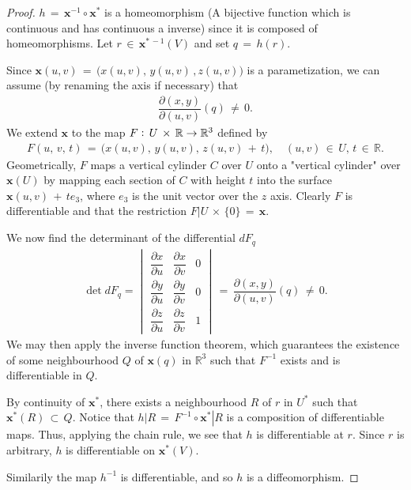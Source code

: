 \documentclass{UKZNcomp}
\newcommand{\vect}[1]{\mathbf{#1}} %
\theoremstyle{definition}
\theoremstyle{remark}
\begin{document}
\begin{proof}
$h\,=\,\vect x^{-1}\circ\vect x^*$ is a homeomorphism (A bijective function which is continuous and has continuous a inverse) since it is composed of homeomorphisms. Let $r\,\in\,\vect x^{*\,-1}(V)$ and set $q\,=\,h(r)$.

Since $\vect x(u,v)\,=\,\big(x(u,v),\,y(u,v)\,,z(u,v)\big)$ is a parametization, we can assume (by renaming the axis if necessary) that
\begin{align*}
\dfrac{\partial (x,y)}{\partial (u,v)}(q)\,\neq\,0.
\end{align*}
We extend $\vect x$ to the map $F\vcentcolon\,U\,\times\,\mathbb{R}\to\mathbb{R}^3$ defined by 
\begin{align*}
F(u,\,v,\,t)\,=\,\big(x(u,v),\,y(u,v),\,z(u,v)\,+\,t\big),\quad (u,v)\,\in\,U,\,t\,\in\,\mathbb{R}.
\end{align*}
Geometrically, $F$ maps a vertical cylinder $C$ over $U$ onto a "vertical cylinder" over $\vect x(U)$ by mapping each section of $C$ with height $t$ into the surface $\vect x(u,v)\,+\,te_3$, where $e_3$ is the unit vector over the $z$ axis. Clearly $F$ is differentiable and that the restriction $\left. F \right| U\,\times\,\{0\}\,=\,\vect x$.

We now find the determinant of the differential $dF_q$
\begin{align*}
\det dF_q = \begin{vmatrix}
    \dfrac{\partial x}{\partial u} & \dfrac{\partial x}{\partial v}	& 0\\
    \dfrac{\partial y}{\partial u} & \dfrac{\partial y}{\partial v} & 0 \\
    \dfrac{\partial z}{\partial u} & \dfrac{\partial z}{\partial v} & 1
\end{vmatrix}\,=\,\dfrac{\partial (x,y)}{\partial (u,v)}(q)\,\neq\,0.
\end{align*}
We may then apply the inverse function theorem, which guarantees the existence of some neighbourhood $Q$ of $\vect x(q)$ in $\mathbb{R}^3$ such that $F^{-1}$ exists and is differentiable in $Q$.

By continuity of $\vect x^*$, there exists a neighbourhood $R$ of $r$ in $U^*$ such that $\vect x^*(R)\,\subset\,Q$. Notice that $\left. h \right| R\,=\,F^{-1}\circ\left.\vect x^*\right| R$ is a composition of differentiable maps. Thus, applying the chain rule, we see that $h$ is differentiable at $r$. Since $r$ is arbitrary, $h$ is differentiable on $\vect x^*(V)$.

Similarily the map $h^{-1}$ is differentiable, and so $h$ is a diffeomorphism.
\end{proof}
\end{document}
